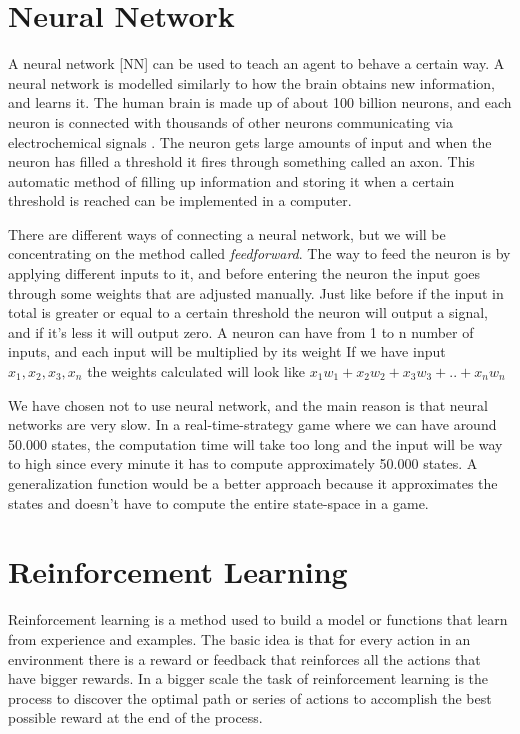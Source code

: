 \section{Neural Network}			 
			
A neural network [NN] can be used to teach an agent to behave a certain way.
A neural network is modelled similarly to how the brain obtains new information, and learns it. The human brain is made up of about 100 billion neurons, and each neuron is connected with thousands of other neurons communicating via electrochemical signals \cite{nn}. The neuron gets large amounts of input and when the neuron has filled a threshold it fires through something called an axon. This automatic method of filling up information and storing it when a certain threshold is reached can be implemented in a computer.

There are different ways of connecting a neural network, but we will be concentrating on the method called \textit{feedforward}. The way to feed the neuron is by applying different inputs to it, and before entering the neuron the input goes through some weights that are adjusted manually. Just like before if the input in total is greater or equal to a certain threshold the neuron will output a signal, and if it's less it will output zero.
A neuron can have from 1 to n number of inputs, and each input will be multiplied by its weight
If we have input $x_1, x_2, x_3, x_n$ the weights calculated will look like $x_1 w_1 + x_2 w_2 + x_3 w_3 + .. +  x_n w_n$


We have chosen not to use neural network, and the main reason is that neural networks are very slow. In a real-time-strategy game where we can have around 50.000 states, the computation time will take too long and the input will be way to high since every minute it has to compute approximately 50.000 states. A generalization function would be a better approach because it approximates the states and doesn't have to compute the entire state-space in a game. 


\section{Reinforcement Learning}

	Reinforcement learning is a method used to build a model or functions that learn from experience and examples. The basic idea is that for every action in an environment there is a reward or feedback that reinforces all the actions that have bigger rewards. In a bigger scale the task of reinforcement learning is the process to discover the optimal path or series of actions to accomplish the best possible reward at the end of the process. 

